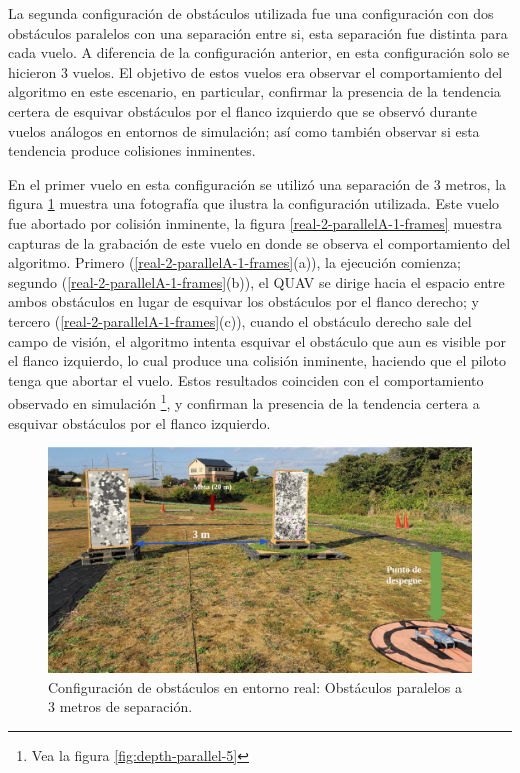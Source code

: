 La segunda configuración de obstáculos utilizada fue una configuración con dos obstáculos paralelos con una separación entre si, esta separación fue distinta para cada vuelo. A diferencia de la configuración anterior, en esta configuración solo se hicieron 3 vuelos. El objetivo de estos vuelos era observar el comportamiento del algoritmo en este escenario, en particular, confirmar la presencia de la tendencia certera de esquivar obstáculos por el flanco izquierdo que se observó durante vuelos análogos en entornos de simulación; así como también observar si esta tendencia produce colisiones inminentes.

En el primer vuelo en esta configuración se utilizó una separación de 3 metros, la figura \ref{real-2-parallelA-0-config} muestra una fotografía que ilustra la configuración utilizada. Este vuelo fue abortado por colisión inminente, la figura \ref{real-2-parallelA-1-frames} muestra capturas de la grabación de este vuelo en donde se observa el comportamiento del algoritmo. Primero (\ref{real-2-parallelA-1-frames}(a)), la ejecución comienza; segundo (\ref{real-2-parallelA-1-frames}(b)), el QUAV se dirige hacia el espacio entre ambos obstáculos en lugar de esquivar los obstáculos por el flanco derecho; y tercero (\ref{real-2-parallelA-1-frames}(c)), cuando el obstáculo derecho sale del campo de visión, el algoritmo intenta esquivar el obstáculo que aun es visible por el flanco izquierdo, lo cual produce una colisión inminente, haciendo que el piloto tenga que abortar el vuelo. Estos resultados coinciden con el comportamiento observado en simulación \footnote[1]{Vea la figura \ref{fig:depth-parallel-5}}, y confirman la presencia de la tendencia certera a esquivar obstáculos por el flanco izquierdo.

\begin{figure}[H]
    \centering
    \includegraphics[scale=0.22]{partes/img/real-2-parallelA-0-config.png}
    \caption[Configuración de obstáculos en entorno real: Obstáculos paralelos a 3 metros de separación.]{Configuración de obstáculos en entorno real: Obstáculos paralelos a 3 metros de separación.}
    \label{real-2-parallelA-0-config}
\end{figure}

